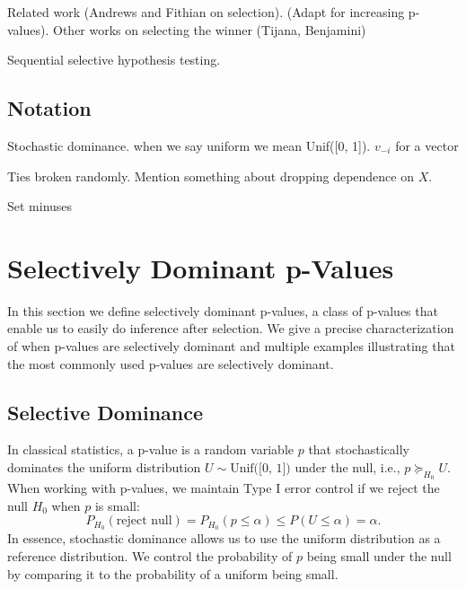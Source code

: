 \documentclass{article}
\begin{document}
Related work (Andrews and Fithian on selection). (Adapt for increasing p-values). Other works on selecting the winner (Tijana, Benjamini) 

Sequential selective hypothesis testing. 


\subsection{Notation}

Stochastic dominance.  when we say uniform we mean Unif([0, 1]). $v_{-i}$ for a vector

Ties broken randomly. Mention something about dropping dependence on $X$. 

Set minuses

\section{Selectively Dominant p-Values}
\label{sec:dominance}

In this section we define selectively dominant p-values, a class of p-values that enable us to easily do inference after selection. We give a precise characterization of when p-values are selectively dominant and multiple examples illustrating that the most commonly used p-values are selectively dominant. 

\subsection{Selective Dominance}

In classical statistics, a p-value is a random variable $p$ that stochastically dominates the uniform distribution $U \sim \text{Unif([0, 1])}$ under the null, i.e., $p \succeq_{H_0} U$. When working with p-values, we maintain Type I error control if we reject the null $H_0$ when $p$ is small:
\begin{equation*}
    P_{H_0}(\text{reject null}) = P_{H_0}(p \leq \alpha) \leq P(U \leq \alpha)  = \alpha.
\end{equation*}
In essence, stochastic dominance allows us to use the uniform distribution as a reference distribution. We control the probability of $p$ being small under the null by comparing it to the probability of a uniform being small. 
\end{document}

